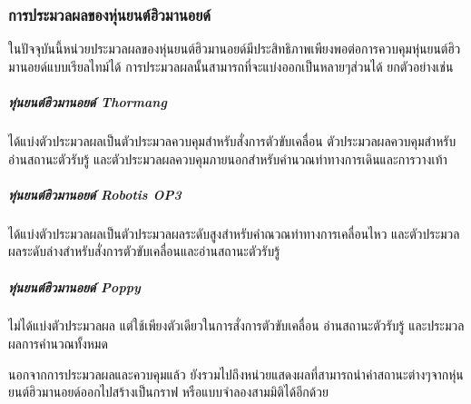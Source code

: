

\subsubsection*{การประมวลผลของหุ่นยนต์ฮิวมานอยด์}
ในปัจจุบันนี้หน่วยประมวลผลของหุ่นยนต์ฮิวมานอยด์มีประสิทธิภาพเพียงพอต่อการควบคุมหุ่นยนต์ฮิวมานอยด์แบบเรียลไทม์ได้
การประมวลผลนั้นสามารถที่จะแบ่งออกเป็นหลายๆส่วนได้ ยกตัวอย่างเช่น

\subparagraph*{หุ่นยนต์ฮิวมานอยด์ Thormang}
ได้แบ่งตัวประมวลผลเป็นตัวประมวลควบคุมสำหรับสั่งการตัวขับเคลื่อน ตัวประมวลผลควบคุมสำหรับอ่านสถานะตัวรับรู้ และตัวประมวลผลควบคุมภายนอกสำหรับคำนวณท่าทางการเดินและการวางเท้า
\subparagraph*{หุ่นยนต์ฮิวมานอยด์ Robotis OP3}
ได้แบ่งตัวประมวลผลเป็นตัวประมวลผลระดับสูงสำหรับคำณวณท่าทางการเคลื่อนไหว และตัวประมวลผลระดับล่างสำหรับสั่งการตัวขับเคลื่อนและอ่านสถานะตัวรับรู้
\subparagraph*{หุ่นยนต์ฮิวมานอยด์ Poppy}
ไม่ได้แบ่งตัวประมวลผล แต่ใช้เพียงตัวเดียวในการสั่งการตัวขับเคลื่อน อ่านสถานะตัวรับรู้ และประมวลผลการคำนวณทั้งหมด

นอกจากการประมวลผลและควบคุมแล้ว ยังรวมไปถึงหน่วยแสดงผลที่สามารถนำค่าสถานะต่างๆจากหุ่นยนต์ฮิวมานอยด์ออกไปสร้างเป็นกราฟ หรือแบบจำลองสามมิติได้อีกด้วย






